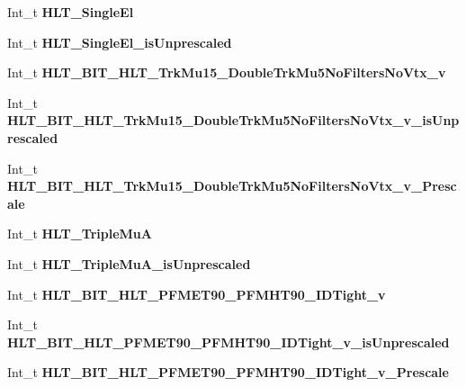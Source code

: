 \begin{DoxyCompactItemize}
Int\+\_\+t {\bfseries H\+L\+T\+\_\+\+Single\+El}
\item 
\hypertarget{classMiniTree_a63d052118f9d8308d3a9c56bbcccf308}{}\label{classMiniTree_a63d052118f9d8308d3a9c56bbcccf308} 
Int\+\_\+t {\bfseries H\+L\+T\+\_\+\+Single\+El\+\_\+is\+Unprescaled}
\item 
\hypertarget{classMiniTree_a80f215114ff873ae1a36c946bd60258f}{}\label{classMiniTree_a80f215114ff873ae1a36c946bd60258f} 
Int\+\_\+t {\bfseries H\+L\+T\+\_\+\+B\+I\+T\+\_\+\+H\+L\+T\+\_\+\+Trk\+Mu15\+\_\+\+Double\+Trk\+Mu5\+No\+Filters\+No\+Vtx\+\_\+v}
\item 
\hypertarget{classMiniTree_a2e11f05fc2b75d2116292a9510b9c24c}{}\label{classMiniTree_a2e11f05fc2b75d2116292a9510b9c24c} 
Int\+\_\+t {\bfseries H\+L\+T\+\_\+\+B\+I\+T\+\_\+\+H\+L\+T\+\_\+\+Trk\+Mu15\+\_\+\+Double\+Trk\+Mu5\+No\+Filters\+No\+Vtx\+\_\+v\+\_\+is\+Unprescaled}
\item 
\hypertarget{classMiniTree_aa040c45a1ebcb63fb3bfa9bfebec142e}{}\label{classMiniTree_aa040c45a1ebcb63fb3bfa9bfebec142e} 
Int\+\_\+t {\bfseries H\+L\+T\+\_\+\+B\+I\+T\+\_\+\+H\+L\+T\+\_\+\+Trk\+Mu15\+\_\+\+Double\+Trk\+Mu5\+No\+Filters\+No\+Vtx\+\_\+v\+\_\+\+Prescale}
\item 
\hypertarget{classMiniTree_ac4a40f03e1f0dc40d01b6614f9f170e0}{}\label{classMiniTree_ac4a40f03e1f0dc40d01b6614f9f170e0} 
Int\+\_\+t {\bfseries H\+L\+T\+\_\+\+Triple\+MuA}
\item 
\hypertarget{classMiniTree_a69db476c0b3431e5d7d73ef9d4e5dd36}{}\label{classMiniTree_a69db476c0b3431e5d7d73ef9d4e5dd36} 
Int\+\_\+t {\bfseries H\+L\+T\+\_\+\+Triple\+Mu\+A\+\_\+is\+Unprescaled}
\item 
\hypertarget{classMiniTree_ac5c49e684840fe21730dced5ef0820a7}{}\label{classMiniTree_ac5c49e684840fe21730dced5ef0820a7} 
Int\+\_\+t {\bfseries H\+L\+T\+\_\+\+B\+I\+T\+\_\+\+H\+L\+T\+\_\+\+P\+F\+M\+E\+T90\+\_\+\+P\+F\+M\+H\+T90\+\_\+\+I\+D\+Tight\+\_\+v}
\item 
\hypertarget{classMiniTree_ae1f766ec201fdaa54b3db159425257ab}{}\label{classMiniTree_ae1f766ec201fdaa54b3db159425257ab} 
Int\+\_\+t {\bfseries H\+L\+T\+\_\+\+B\+I\+T\+\_\+\+H\+L\+T\+\_\+\+P\+F\+M\+E\+T90\+\_\+\+P\+F\+M\+H\+T90\+\_\+\+I\+D\+Tight\+\_\+v\+\_\+is\+Unprescaled}
\item 
\hypertarget{classMiniTree_a3e55555aeae2979e9a7c8a569fb5da24}{}\label{classMiniTree_a3e55555aeae2979e9a7c8a569fb5da24} 
Int\+\_\+t {\bfseries H\+L\+T\+\_\+\+B\+I\+T\+\_\+\+H\+L\+T\+\_\+\+P\+F\+M\+E\+T90\+\_\+\+P\+F\+M\+H\+T90\+\_\+\+I\+D\+Tight\+\_\+v\+\_\+\+Prescale}

\end{DoxyCompactItemize}

